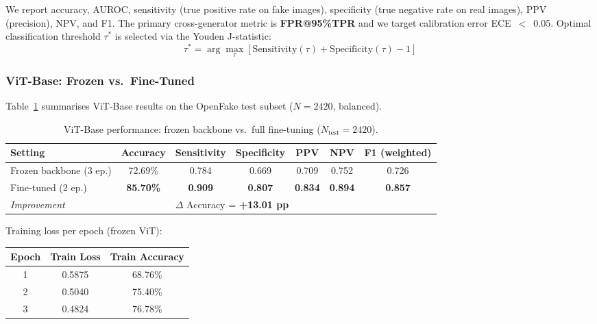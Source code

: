 \documentclass[12pt, a4paper]{article}
\begin{document}
We report accuracy, AUROC, sensitivity (true positive rate on fake images),
specificity (true negative rate on real images), PPV (precision), NPV, and F1.
The primary cross-generator metric is \textbf{FPR@95\%TPR} and we target
calibration error ECE~$<$~0.05.  Optimal classification threshold $\tau^*$ is
selected via the Youden J-statistic:
\begin{equation}
  \tau^* = \arg\max_\tau\left[\mathrm{Sensitivity}(\tau) +
                               \mathrm{Specificity}(\tau) - 1\right]
  \label{eq:youden}
\end{equation}

\subsubsection{ViT-Base: Frozen vs.\ Fine-Tuned}

Table~\ref{tab:vit} summarises ViT-Base results on the OpenFake test subset
($N=2420$, balanced).

\begin{table}[H]
\centering
\caption{ViT-Base performance: frozen backbone vs.\ full fine-tuning
         ($N_{\text{test}}=2420$).}
\label{tab:vit}
\begin{tabular}{lcccccc}
\toprule
\textbf{Setting} & \textbf{Accuracy} & \textbf{Sensitivity}
  & \textbf{Specificity} & \textbf{PPV} & \textbf{NPV} & \textbf{F1 (weighted)} \\
\midrule
Frozen backbone (3 ep.)     & 72.69\% & 0.784 & 0.669 & 0.709 & 0.752 & 0.726 \\
Fine-tuned (2 ep.)          & \textbf{85.70\%} & \textbf{0.909} & \textbf{0.807}
  & \textbf{0.834} & \textbf{0.894} & \textbf{0.857} \\
\midrule
\multicolumn{2}{l}{\textit{Improvement}} & \multicolumn{5}{l}{$\Delta$ Accuracy = \textbf{+13.01 pp}} \\
\bottomrule
\end{tabular}
\end{table}

\noindent Training loss per epoch (frozen ViT):

\begin{center}
\begin{tabular}{ccc}
\toprule
\textbf{Epoch} & \textbf{Train Loss} & \textbf{Train Accuracy} \\
\midrule
1 & 0.5875 & 68.76\% \\
2 & 0.5040 & 75.40\% \\
3 & 0.4824 & 76.78\% \\
\bottomrule
\end{tabular}
\end{center}
\end{document}
